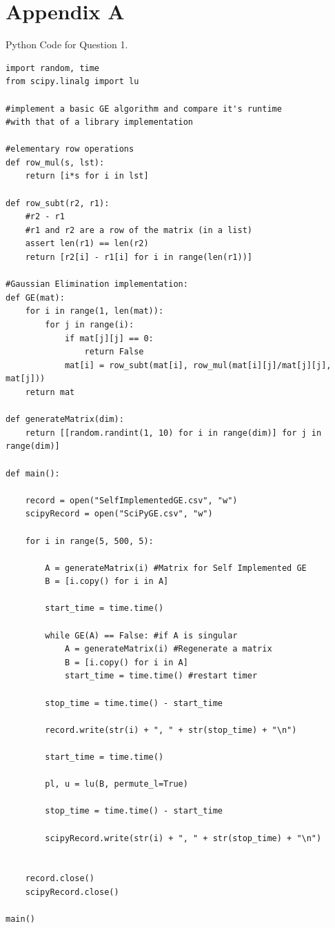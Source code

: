\documentclass[a4paper, 11pt]{article}
\begin{document}
\section{Appendix A}
Python Code for Question 1. \cite{two}
	\begin{verbatim}
import random, time
from scipy.linalg import lu

#implement a basic GE algorithm and compare it's runtime 
#with that of a library implementation

#elementary row operations
def row_mul(s, lst):
    return [i*s for i in lst]

def row_subt(r2, r1):
    #r2 - r1
    #r1 and r2 are a row of the matrix (in a list)
    assert len(r1) == len(r2)
    return [r2[i] - r1[i] for i in range(len(r1))]

#Gaussian Elimination implementation:
def GE(mat):
    for i in range(1, len(mat)):
        for j in range(i):
            if mat[j][j] == 0:
                return False
            mat[i] = row_subt(mat[i], row_mul(mat[i][j]/mat[j][j], mat[j])) 
    return mat

def generateMatrix(dim):
    return [[random.randint(1, 10) for i in range(dim)] for j in range(dim)]

def main():

    record = open("SelfImplementedGE.csv", "w")
    scipyRecord = open("SciPyGE.csv", "w")

    for i in range(5, 500, 5):
			
        A = generateMatrix(i) #Matrix for Self Implemented GE
        B = [i.copy() for i in A]

        start_time = time.time()
		
        while GE(A) == False: #if A is singular
            A = generateMatrix(i) #Regenerate a matrix 
            B = [i.copy() for i in A] 
            start_time = time.time() #restart timer

        stop_time = time.time() - start_time
		
        record.write(str(i) + ", " + str(stop_time) + "\n")
		
        start_time = time.time()
		
        pl, u = lu(B, permute_l=True)
		
        stop_time = time.time() - start_time
		
        scipyRecord.write(str(i) + ", " + str(stop_time) + "\n")
		
		
    record.close()
    scipyRecord.close()

main()

	\end{verbatim}
\end{document}
